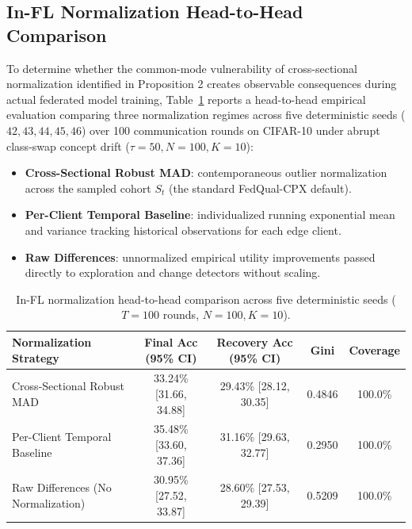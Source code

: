 \documentclass[conference]{IEEEtran}
\begin{document}
\subsection{In-FL Normalization Head-to-Head Comparison}
\label{sec:fl_norm_comp}
To determine whether the common-mode vulnerability of cross-sectional normalization identified in Proposition 2 creates observable consequences during actual federated model training, Table~\ref{tab:fl_norm_results} reports a head-to-head empirical evaluation comparing three normalization regimes across five deterministic seeds ($42, 43, 44, 45, 46$) over 100 communication rounds on CIFAR-10 under abrupt class-swap concept drift ($\tau=50, N=100, K=10$):
\begin{itemize}
\item \textbf{Cross-Sectional Robust MAD}: contemporaneous outlier normalization across the sampled cohort $S_t$ (the standard FedQual-CPX default).
\item \textbf{Per-Client Temporal Baseline}: individualized running exponential mean and variance tracking historical observations for each edge client.
\item \textbf{Raw Differences}: unnormalized empirical utility improvements passed directly to exploration and change detectors without scaling.
\end{itemize}

\begin{table}[h]
\centering
\caption{In-FL normalization head-to-head comparison across five deterministic seeds ($T=100$ rounds, $N=100, K=10$).}
\label{tab:fl_norm_results}
\begin{tabular}{lcccc}
\toprule
Normalization Strategy & Final Acc (95\% CI) & Recovery Acc (95\% CI) & Gini & Coverage \\
\midrule
Cross-Sectional Robust MAD & 33.24\% [31.66, 34.88] & 29.43\% [28.12, 30.35] & 0.4846 & 100.0\% \\
Per-Client Temporal Baseline & 35.48\% [33.60, 37.36] & 31.16\% [29.63, 32.77] & 0.2950 & 100.0\% \\
Raw Differences (No Normalization) & 30.95\% [27.52, 33.87] & 28.60\% [27.53, 29.39] & 0.5209 & 100.0\% \\
\bottomrule
\end{tabular}
\end{table}
\end{document}
